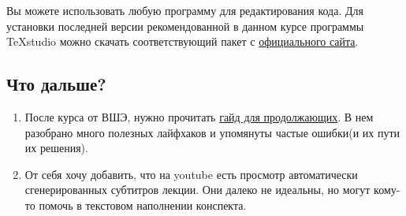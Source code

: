Вы можете использовать любую программу для редактирования кода. Для установки последней версии рекомендованной в данном курсе программы TeXstudio можно скачать соответствующий пакет с \href{http://texstudio.sourceforge.net/#download}{официального сайта}.

\subsection{Что дальше?}
\begin{enumerate}
    \item После курса от ВШЭ, нужно прочитать \href{https://drive.google.com/file/d/1ItSd7wIKDC0uJiJ-Hifd1JO3MKASVVKl/view?usp=sharing}{гайд для продолжающих}. 
    В нем разобрано много полезных лайфхаков и упомянуты частые ошибки(и их пути их решения). 
    
    \item От себя хочу добавить, что на youtube есть просмотр автоматически сгенерированных субтитров лекции. 
    Они далеко не идеальны, но могут кому-то помочь в текстовом наполнении конспекта.

\end{enumerate}
